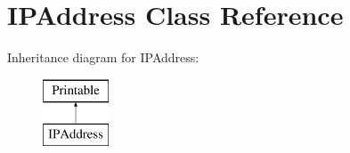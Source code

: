 \hypertarget{class_i_p_address}{\section{I\-P\-Address Class Reference}
\label{class_i_p_address}
}
Inheritance diagram for I\-P\-Address\-:\begin{figure}[H]
\begin{center}
\leavevmode
\includegraphics[height=2.000000cm]{class_i_p_address}
\end{center}
\end{figure}
